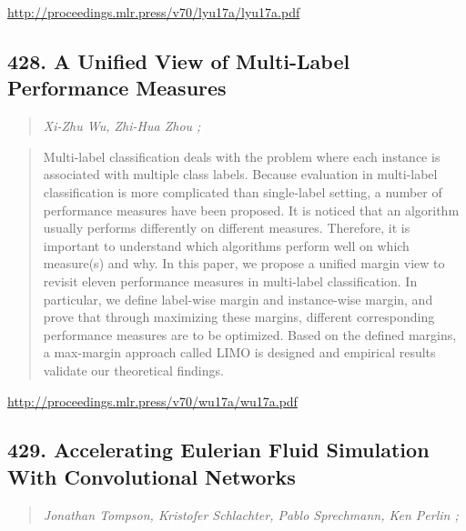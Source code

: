 \documentclass{article}
\begin{document}
\href{http://proceedings.mlr.press/v70/lyu17a/lyu17a.pdf}{http://proceedings.mlr.press/v70/lyu17a/lyu17a.pdf}

\subsection{428. A Unified View of Multi-Label Performance Measures}

\begin{quote}
\footnotesize{\textit{Xi-Zhu Wu, Zhi-Hua Zhou ;}}

\end{quote}

\begin{quote}
    Multi-label classification deals with the problem where each instance is associated with multiple class labels. Because evaluation in multi-label classification is more complicated than single-label setting, a number of performance measures have been proposed. It is noticed that an algorithm usually performs differently on different measures. Therefore, it is important to understand which algorithms perform well on which measure(s) and why. In this paper, we propose a unified margin view to revisit eleven performance measures in multi-label classification. In particular, we define label-wise margin and instance-wise margin, and prove that through maximizing these margins, different corresponding performance measures are to be optimized. Based on the defined margins, a max-margin approach called LIMO is designed and empirical results validate our theoretical findings.  
\end{quote}

\href{http://proceedings.mlr.press/v70/wu17a/wu17a.pdf}{http://proceedings.mlr.press/v70/wu17a/wu17a.pdf}

\subsection{429. Accelerating Eulerian Fluid Simulation With Convolutional Networks}

\begin{quote}
\footnotesize{\textit{Jonathan Tompson, Kristofer Schlachter, Pablo Sprechmann, Ken Perlin ;}}

\end{quote}
\end{document}
